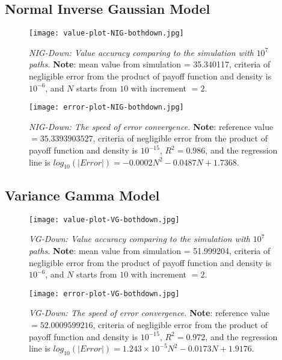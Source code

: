 \subsection{Normal Inverse Gaussian Model}
\begin{figure}[H]
    \centering
    \texttt{[image: value-plot-NIG-bothdown.jpg]}
    \caption[\emph{NIG-Down: Value accuracy comparing to the simulation with} $10^7$ \emph{paths.}]{\emph{NIG-Down: Value accuracy comparing to the simulation with} $10^7$ \emph{paths.} \textbf{Note}: mean value from simulation = 35.340117, criteria of negligible error from the product of payoff function and density is $10^{-6}$, and $N$ starts from $10$  with increment $=2$.}

    \label{fig:label}
\end{figure}

\begin{figure}[H]
    \centering
    \texttt{[image: error-plot-NIG-bothdown.jpg]}
    \caption[\emph{NIG-Down: The speed of error convergence.}]{\emph{NIG-Down: The speed of error convergence.} \textbf{Note}: reference value $=35.3393903527$, criteria of negligible error from the product of payoff function and density is $10^{-15}$, $R^2=0.986$, and the regression line is $log_{10}\left(|Error|\right) = -0.0002N^2-0.0487N+1.7368$.}

    \label{fig:label}
\end{figure}


\subsection{Variance Gamma Model}
\begin{figure}[H]
    \centering
    \texttt{[image: value-plot-VG-bothdown.jpg]}
    \caption[\emph{VG-Down: Value accuracy comparing to the simulation with} $10^7$ \emph{paths.}]{\emph{VG-Down: Value accuracy comparing to the simulation with} $10^7$ \emph{paths.} \textbf{Note}: mean value from simulation = 51.999204, criteria of negligible error from the product of payoff function and density is $10^{-6}$, and $N$ starts from $10$  with increment $=2$.}

    \label{fig:label}
\end{figure}

\begin{figure}[H]
    \centering
    \texttt{[image: error-plot-VG-bothdown.jpg]}
    \caption[\emph{VG-Down: The speed of error convergence.}]{\emph{VG-Down: The speed of error convergence.} \textbf{Note}: reference value $=52.0009599216$, criteria of negligible error from the product of payoff function and density is $10^{-15}$, $R^2=0.972$, and the regression line is $log_{10}\left(|Error|\right) = 1.243\times 10^{-5}N^2-0.0173N+1.9176$.}

    \label{fig:label}
\end{figure}

